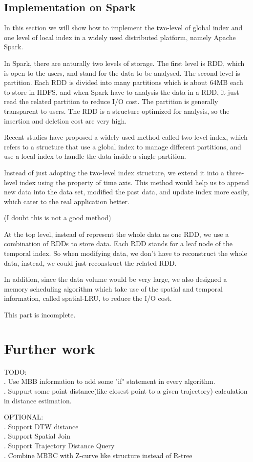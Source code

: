 \documentclass[sigplan]{acmart}
\begin{document}
\subsection{Implementation on Spark}
In this section we will show how to implement the two-level of global index and one level of local index in a widely used distributed platform, namely Apache Spark.\par
In Spark, there are naturally two levels of storage. The first level is RDD, which is open to the users, and stand for the data to be analysed. The second level is partition. Each RDD is divided into many partitions which is about 64MB each to store in HDFS, and when Spark have to analysis the data in a RDD, it just read the related partition to reduce I/O cost. The partition is generally transparent to users. The RDD is a structure optimized for analysis, so the insertion and deletion cost are very high.\par
Recent studies have proposed a widely used method called two-level index, which refers to a structure that use a global index to manage different partitions, and use a local index to handle the data inside a single partition. \par
Instead of just adopting the two-level index structure, we extend it into a three-level index using the property of time axis. This method would help us to append new data into the data set, modified the past data, and update index more easily, which cater to the real application better.\par
(I doubt this is not a good method)\par
At the top level, instead of represent the whole data as one RDD, we use a combination of RDDs to store data. Each RDD stands for a leaf node of the temporal index. So when modifying data, we don't have to reconstruct the whole data, instead, we could just reconstruct the related RDD.\par
In addition, since the data volume would be very large, we also designed a memory scheduling algorithm which take use of the spatial and temporal information, called spatial-LRU, to reduce the I/O cost.\par

This part is incomplete.

\section{Further work}
TODO:\\
. Use MBB information to add some "if" statement in every algorithm.\\
. Suppurt some point distance(like closest point to a given trajectory) calculation in distance estimation.\par
OPTIONAL:\\
. Support DTW distance\\
. Support Spatial Join\\
. Support Trajectory Distance Query\\
. Combine MBBC with Z-curve like structure instead of R-tree\par



\end{document}
